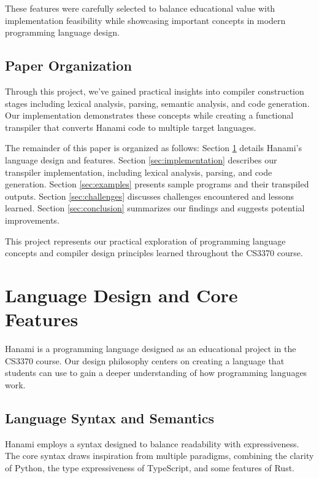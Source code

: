 \documentclass[conference]{IEEEtran}
\begin{document}
	These features were carefully selected to balance educational value with implementation feasibility while showcasing important concepts in modern programming language design.
	
	\subsection{Paper Organization}
	
	Through this project, we've gained practical insights into compiler construction stages including lexical analysis, parsing, semantic analysis, and code generation. Our implementation demonstrates these concepts while creating a functional transpiler that converts Hanami code to multiple target languages.
	
	The remainder of this paper is organized as follows: Section \ref{sec:design} details Hanami's language design and features. Section \ref{sec:implementation} describes our transpiler implementation, including lexical analysis, parsing, and code generation. Section \ref{sec:examples} presents sample programs and their transpiled outputs. Section \ref{sec:challenges} discusses challenges encountered and lessons learned. Section \ref{sec:conclusion} summarizes our findings and suggests potential improvements.
	
	This project represents our practical exploration of programming language concepts and compiler design principles learned throughout the CS3370 course.
	
	\section{Language Design and Core Features}
	\label{sec:design}
	
	Hanami is a programming language designed as an educational project in the CS3370 course. Our design philosophy centers on creating a language that students can use to gain a deeper understanding of how programming languages work.
	
	\subsection{Language Syntax and Semantics}
	
	Hanami employs a syntax designed to balance readability with expressiveness. The core syntax draws inspiration from multiple paradigms, combining the clarity of Python, the type expressiveness of TypeScript, and some features of Rust.
	
\end{document}
